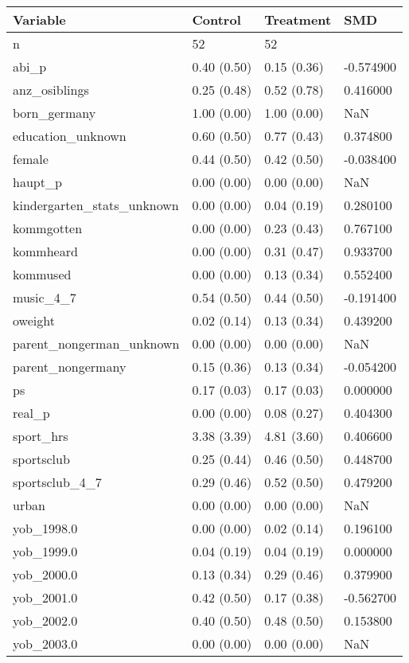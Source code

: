 \begin{tabular}{llll}
\toprule
Variable & Control & Treatment & SMD \\
\midrule
n & 52 & 52 &  \\
abi\_p & 0.40 (0.50) & 0.15 (0.36) & -0.574900 \\
anz\_osiblings & 0.25 (0.48) & 0.52 (0.78) & 0.416000 \\
born\_germany & 1.00 (0.00) & 1.00 (0.00) & NaN \\
education\_unknown & 0.60 (0.50) & 0.77 (0.43) & 0.374800 \\
female & 0.44 (0.50) & 0.42 (0.50) & -0.038400 \\
haupt\_p & 0.00 (0.00) & 0.00 (0.00) & NaN \\
kindergarten\_stats\_unknown & 0.00 (0.00) & 0.04 (0.19) & 0.280100 \\
kommgotten & 0.00 (0.00) & 0.23 (0.43) & 0.767100 \\
kommheard & 0.00 (0.00) & 0.31 (0.47) & 0.933700 \\
kommused & 0.00 (0.00) & 0.13 (0.34) & 0.552400 \\
music\_4\_7 & 0.54 (0.50) & 0.44 (0.50) & -0.191400 \\
oweight & 0.02 (0.14) & 0.13 (0.34) & 0.439200 \\
parent\_nongerman\_unknown & 0.00 (0.00) & 0.00 (0.00) & NaN \\
parent\_nongermany & 0.15 (0.36) & 0.13 (0.34) & -0.054200 \\
ps & 0.17 (0.03) & 0.17 (0.03) & 0.000000 \\
real\_p & 0.00 (0.00) & 0.08 (0.27) & 0.404300 \\
sport\_hrs & 3.38 (3.39) & 4.81 (3.60) & 0.406600 \\
sportsclub & 0.25 (0.44) & 0.46 (0.50) & 0.448700 \\
sportsclub\_4\_7 & 0.29 (0.46) & 0.52 (0.50) & 0.479200 \\
urban & 0.00 (0.00) & 0.00 (0.00) & NaN \\
yob\_1998.0 & 0.00 (0.00) & 0.02 (0.14) & 0.196100 \\
yob\_1999.0 & 0.04 (0.19) & 0.04 (0.19) & 0.000000 \\
yob\_2000.0 & 0.13 (0.34) & 0.29 (0.46) & 0.379900 \\
yob\_2001.0 & 0.42 (0.50) & 0.17 (0.38) & -0.562700 \\
yob\_2002.0 & 0.40 (0.50) & 0.48 (0.50) & 0.153800 \\
yob\_2003.0 & 0.00 (0.00) & 0.00 (0.00) & NaN \\
\bottomrule
\end{tabular}
